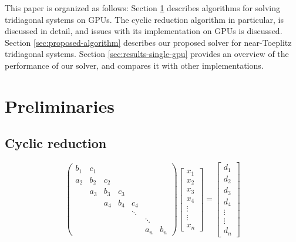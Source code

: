 \documentclass{elsarticle}
\begin{document}
This paper is organized as follows:
Section \ref{sec:preliminaries}
describes algorithms for solving tridiagonal systems on GPUs.
The cyclic reduction algorithm in particular, is discussed in detail,
and issues with its implementation on GPUs is discussed.
Section \ref{sec:proposed-algorithm}
describes our proposed solver for near-Toeplitz tridiagonal systems.
Section \ref{sec:results-single-gpu}
provides an overview of the performance of our solver,
and compares it with other implementations.

\section{Preliminaries} \label{sec:preliminaries}

\subsection{Cyclic reduction}

\begin{equation} \label{eqn:general-tridiagonal-system}
\begin{pmatrix}
     b_1 & c_1  \\
     a_2 & b_2  &  c_2  \\
         & a_3  &  b_3 &  c_3  \\
         &      &  a_4 &  b_4 &  c_4  \\
         &      &      &      &  \ddots \\
         &      &      &      &     &  \ddots  \\
         &      &      &      &     &  a_n  &  b_n
\end{pmatrix}
\begin{bmatrix}
    x_1 \\
    x_2 \\
    x_3 \\
    x_4 \\
    \vdots \\
    \vdots \\
    x_n
 \end{bmatrix}
=
\begin{bmatrix}
   d_1 \\
   d_2 \\
   d_3 \\
   d_4 \\
   \vdots \\
   \vdots \\
   d_{n}
\end{bmatrix}
\end{equation}
\end{document}
